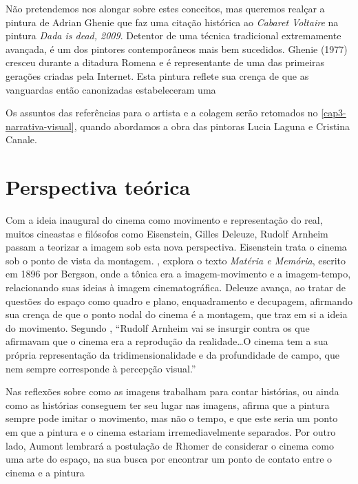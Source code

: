 Não pretendemos nos alongar sobre estes conceitos, mas queremos realçar
a pintura de Adrian Ghenie que faz uma citação histórica ao
\emph{Cabaret Voltaire} na pintura \emph{Dada is dead, 2009}. Detentor
de uma técnica tradicional extremamente avançada, é um dos pintores
contemporâneos mais bem sucedidos. Ghenie (1977) cresceu durante a
ditadura Romena e é representante de uma das primeiras gerações criadas
pela Internet. Esta pintura reflete sua crença de que as vanguardas
então canonizadas estabeleceram uma

Os assuntos das referências para o artista e a colagem serão retomados
no \cref{cap3-narrativa-visual}, quando abordamos a obra das pintoras
Lucia Laguna e Cristina Canale.

\section{Perspectiva teórica}%
\label{perspectiva-teuxf3rica}

Com a ideia inaugural do cinema como movimento e representação do real,
muitos cineastas e filósofos como Eisenstein, Gilles Deleuze, Rudolf
Arnheim passam a teorizar a imagem sob esta nova perspectiva.
Eisenstein trata o cinema sob o ponto de vista da montagem.
\textcite{deleuze2004imagem}, explora o texto \emph{Matéria e Memória},
escrito em 1896 por Bergson, onde a tônica era a imagem-movimento e a
imagem-tempo, relacionando suas ideias à imagem cinematográfica.
Deleuze avança, ao tratar de questões do espaço como quadro e plano,
enquadramento e decupagem, afirmando sua crença de que o ponto nodal do
cinema é a montagem, que traz em si a ideia do movimento. Segundo
\textcite[49--50]{gil2005atmosfera}, \enquote{Rudolf Arnheim vai se
	insurgir contra os que afirmavam que o cinema era a reprodução da
	realidade\ldots O cinema tem a sua própria representação da
	tridimensionalidade e da profundidade de campo, que nem sempre
	corresponde à percepção visual.}

Nas reflexões sobre como as imagens trabalham para contar histórias, ou
ainda como as histórias conseguem ter seu lugar nas imagens,
\textcite{aumont2004olho} afirma que a pintura sempre pode imitar o
movimento, mas não o tempo, e que este seria um ponto em que a pintura
e o cinema estariam irremediavelmente separados. Por outro lado, Aumont
lembrará a postulação de Rhomer de considerar o cinema como uma arte do
espaço, na sua busca por encontrar um ponto de contato entre o cinema e
a pintura

